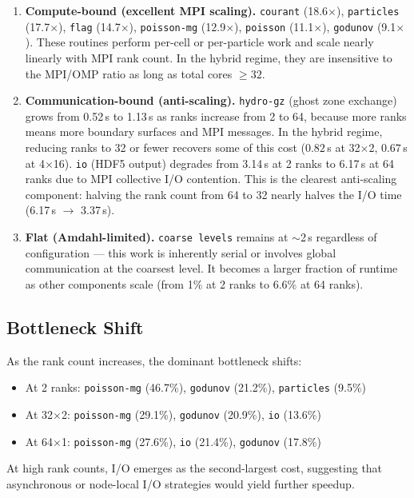 \documentclass[11pt,fleqn]{book}
\begin{document}
\begin{enumerate}
\item \textbf{Compute-bound (excellent MPI scaling).}
  \texttt{courant} (18.6$\times$), \texttt{particles} (17.7$\times$), \texttt{flag} (14.7$\times$), \texttt{poisson-mg} (12.9$\times$), \texttt{poisson} (11.1$\times$), \texttt{godunov} (9.1$\times$).
  These routines perform per-cell or per-particle work and scale nearly linearly with MPI rank count.  In the hybrid regime, they are insensitive to the MPI/OMP ratio as long as total cores $\geq 32$.

\item \textbf{Communication-bound (anti-scaling).}
  \texttt{hydro-gz} (ghost zone exchange) grows from 0.52\,s to 1.13\,s as ranks increase from 2 to 64, because more ranks means more boundary surfaces and MPI messages.  In the hybrid regime, reducing ranks to 32 or fewer recovers some of this cost ($0.82$\,s at 32$\times$2, $0.67$\,s at 4$\times$16).
  \texttt{io} (HDF5 output) degrades from 3.14\,s at 2 ranks to 6.17\,s at 64 ranks due to MPI collective I/O contention.  This is the clearest anti-scaling component: halving the rank count from 64 to 32 nearly halves the I/O time (6.17\,s $\to$ 3.37\,s).

\item \textbf{Flat (Amdahl-limited).}
  \texttt{coarse levels} remains at $\sim$2\,s regardless of configuration --- this work is inherently serial or involves global communication at the coarsest level.  It becomes a larger fraction of runtime as other components scale (from 1\% at 2 ranks to 6.6\% at 64 ranks).
\end{enumerate}

\subsection{Bottleneck Shift}

As the rank count increases, the dominant bottleneck shifts:
\begin{itemize}[nosep]
\item At 2 ranks: \texttt{poisson-mg} (46.7\%), \texttt{godunov} (21.2\%), \texttt{particles} (9.5\%)
\item At 32$\times$2: \texttt{poisson-mg} (29.1\%), \texttt{godunov} (20.9\%), \texttt{io} (13.6\%)
\item At 64$\times$1: \texttt{poisson-mg} (27.6\%), \texttt{io} (21.4\%), \texttt{godunov} (17.8\%)
\end{itemize}
At high rank counts, I/O emerges as the second-largest cost, suggesting that asynchronous or node-local I/O strategies would yield further speedup.
\end{document}
